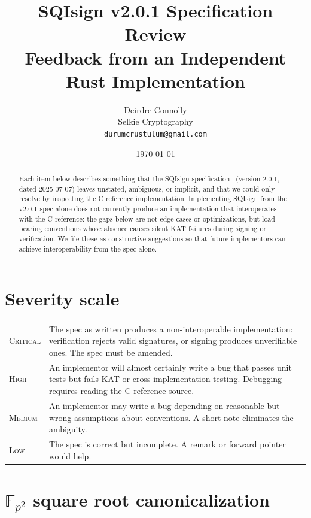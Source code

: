 \documentclass[a4paper,11pt]{article}
\title{SQIsign v2.0.1 Specification Review\\[0.3em]
  {\large Feedback from an Independent Rust Implementation}}
\author{Deirdre Connolly\\[0.2em]
  \small Selkie Cryptography\\
  \small\texttt{durumcrustulum@gmail.com}}
\date{\today\enspace{\small(living document)}}
\newcommand{\Fpii}{\mathbb{F}_{p^2}}
\newcommand{\critical}{\textsc{\color{BrickRed}Critical}}
\newcommand{\high}{\textsc{\color{BurntOrange}High}}
\newcommand{\medium}{\textsc{\color{RoyalBlue}Medium}}
\newcommand{\low}{\textsc{\color{OliveGreen}Low}}
\begin{document}
\maketitle

\begin{abstract}
Each item below describes something that the SQIsign
specification~\cite{sqisign-spec} (version 2.0.1, dated 2025-07-07) leaves unstated,
ambiguous, or implicit, and that we could only resolve by inspecting the
C reference implementation.  Implementing SQIsign from the v2.0.1 spec
alone does not currently produce an implementation that interoperates
with the C reference: the gaps below are not edge cases or
optimizations, but load-bearing conventions whose absence causes silent
KAT failures during signing or verification.  We file these as
constructive suggestions so that future implementors can achieve
interoperability from the spec alone.
\end{abstract}

\tableofcontents

\section{Severity scale}

\smallskip
\begin{tabular}{@{}lp{}@{}}
\toprule
\critical & The spec as written produces a non-interoperable
    implementation: verification rejects valid signatures, or signing
    produces unverifiable ones.  The spec must be amended. \\[0.4em]
\high & An implementor will almost certainly write a bug that passes
    unit tests but fails KAT or cross-implementation testing.
    Debugging requires reading the C reference source. \\[0.4em]
\medium & An implementor may write a bug depending on reasonable but
    wrong assumptions about conventions.  A short note eliminates the
    ambiguity. \\[0.4em]
\low & The spec is correct but incomplete.  A remark or forward pointer
    would help. \\
\bottomrule
\end{tabular}

\section{\texorpdfstring{$\Fpii$}{Fp2} square root canonicalization}
\label{sec:sqrt}
\end{document}
